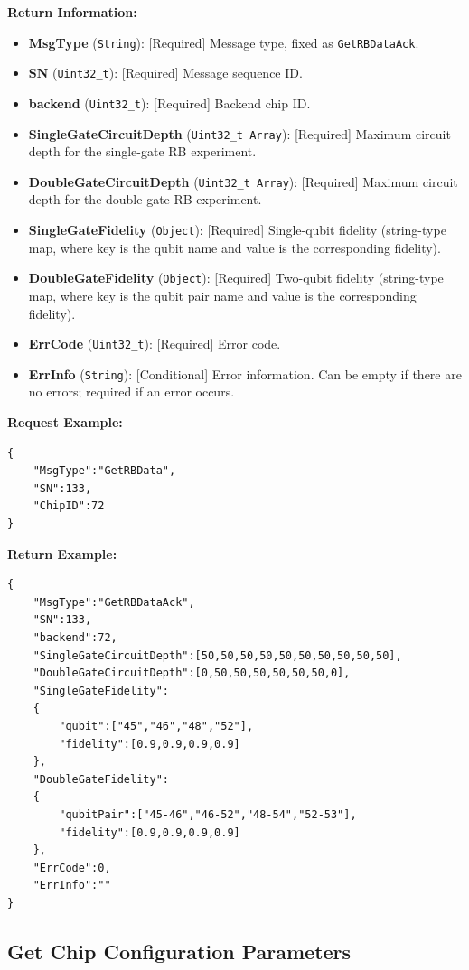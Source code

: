 \documentclass[12pt, a4paper]{article}
\begin{document}
\textbf{Return Information:}
\begin{itemize}
    \item \textbf{MsgType} (\texttt{String}): [Required] Message type, fixed as \texttt{GetRBDataAck}.
    \item \textbf{SN} (\texttt{Uint32\_t}): [Required] Message sequence ID.
    \item \textbf{backend} (\texttt{Uint32\_t}): [Required] Backend chip ID.
    \item \textbf{SingleGateCircuitDepth} (\texttt{Uint32\_t Array}): [Required] Maximum circuit depth for the single-gate RB experiment.
    \item \textbf{DoubleGateCircuitDepth} (\texttt{Uint32\_t Array}): [Required] Maximum circuit depth for the double-gate RB experiment.
    \item \textbf{SingleGateFidelity} (\texttt{Object}): [Required] Single-qubit fidelity (string-type map, where key is the qubit name and value is the corresponding fidelity).
    \item \textbf{DoubleGateFidelity} (\texttt{Object}): [Required] Two-qubit fidelity (string-type map, where key is the qubit pair name and value is the corresponding fidelity).
    \item \textbf{ErrCode} (\texttt{Uint32\_t}): [Required] Error code.
    \item \textbf{ErrInfo} (\texttt{String}): [Conditional] Error information. Can be empty if there are no errors; required if an error occurs.
\end{itemize}

\noindent \textbf{Request Example:}
\begin{lstlisting}
{
    "MsgType":"GetRBData",
    "SN":133,
    "ChipID":72
}
\end{lstlisting}

\noindent \textbf{Return Example:}
\begin{lstlisting}
{
    "MsgType":"GetRBDataAck",
    "SN":133,
    "backend":72,
    "SingleGateCircuitDepth":[50,50,50,50,50,50,50,50,50,50],
    "DoubleGateCircuitDepth":[0,50,50,50,50,50,50,0],
    "SingleGateFidelity":
    {
        "qubit":["45","46","48","52"],
        "fidelity":[0.9,0.9,0.9,0.9]
    },
    "DoubleGateFidelity":
    {
        "qubitPair":["45-46","46-52","48-54","52-53"],
   	    "fidelity":[0.9,0.9,0.9,0.9]
    },
    "ErrCode":0,
    "ErrInfo":"" 
}
\end{lstlisting}

\subsection{Get Chip Configuration Parameters}
\end{document}
